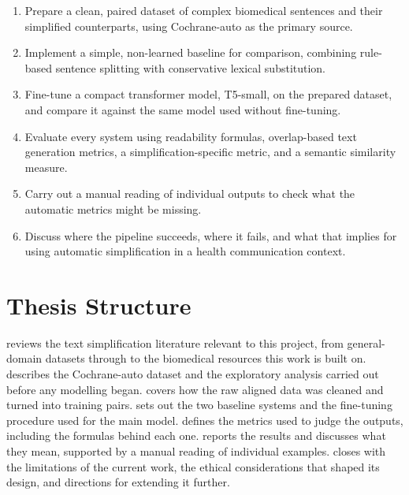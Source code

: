 \begin{enumerate}
    \item Prepare a clean, paired dataset of complex biomedical sentences and their simplified counterparts, using Cochrane-auto as the primary source.
    \item Implement a simple, non-learned baseline for comparison, combining rule-based sentence splitting with conservative lexical substitution.
    \item Fine-tune a compact transformer model, T5-small, on the prepared dataset, and compare it against the same model used without fine-tuning.
    \item Evaluate every system using readability formulas, overlap-based text generation metrics, a simplification-specific metric, and a semantic similarity measure.
    \item Carry out a manual reading of individual outputs to check what the automatic metrics might be missing.
    \item Discuss where the pipeline succeeds, where it fails, and what that implies for using automatic simplification in a health communication context.
\end{enumerate}

\section{Thesis Structure}
\label{sec:thesis-structure}

 reviews the text simplification literature relevant to this project, from general-domain datasets through to the biomedical resources this work is built on.  describes the Cochrane-auto dataset and the exploratory analysis carried out before any modelling began.  covers how the raw aligned data was cleaned and turned into training pairs.  sets out the two baseline systems and the fine-tuning procedure used for the main model.  defines the metrics used to judge the outputs, including the formulas behind each one.  reports the results and discusses what they mean, supported by a manual reading of individual examples.  closes with the limitations of the current work, the ethical considerations that shaped its design, and directions for extending it further.
